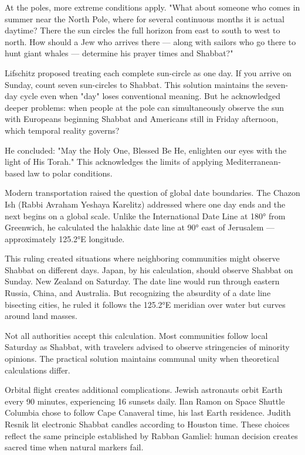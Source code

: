 At the poles, more extreme conditions apply. "What about someone who comes in summer near the North Pole, where for several continuous months it is actual daytime? There the sun circles the full horizon from east to south to west to north. How should a Jew who arrives there — along with sailors who go there to hunt giant whales — determine his prayer times and Shabbat?"

Lifschitz proposed treating each complete sun-circle as one day. If you arrive on Sunday, count seven sun-circles to Shabbat. This solution maintains the seven-day cycle even when "day" loses conventional meaning. But he acknowledged deeper problems: when people at the pole can simultaneously observe the sun with Europeans beginning Shabbat and Americans still in Friday afternoon, which temporal reality governs?

He concluded: "May the Holy One, Blessed Be He, enlighten our eyes with the light of His Torah." This acknowledges the limits of applying Mediterranean-based law to polar conditions.

Modern transportation raised the question of global date boundaries. The Chazon Ish (Rabbi Avraham Yeshaya Karelitz) addressed where one day ends and the next begins on a global scale. Unlike the International Date Line at 180° from Greenwich, he calculated the halakhic date line at 90° east of Jerusalem — approximately 125.2°E longitude.

This ruling created situations where neighboring communities might observe Shabbat on different days. Japan, by his calculation, should observe Shabbat on Sunday. New Zealand on Saturday. The date line would run through eastern Russia, China, and Australia. But recognizing the absurdity of a date line bisecting cities, he ruled it follows the 125.2°E meridian over water but curves around land masses.

Not all authorities accept this calculation. Most communities follow local Saturday as Shabbat, with travelers advised to observe stringencies of minority opinions. The practical solution maintains communal unity when theoretical calculations differ.

Orbital flight creates additional complications. Jewish astronauts orbit Earth every 90 minutes, experiencing 16 sunsets daily. Ilan Ramon on Space Shuttle Columbia chose to follow Cape Canaveral time, his last Earth residence. Judith Resnik lit electronic Shabbat candles according to Houston time. These choices reflect the same principle established by Rabban Gamliel: human decision creates sacred time when natural markers fail.

